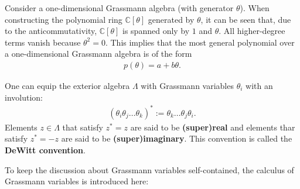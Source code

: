     \begin{property}[Polynomials]
        Consider a one-dimensional Grassmann algebra (with generator $\theta$). When constructing the polynomial ring $\mathbb{C}[\theta]$ generated by $\theta$, it can be seen that, due to the anticommutativity, $\mathbb{C}[\theta]$ is spanned only by $1$ and $\theta$. All higher-degree terms vanish because $\theta^2 = 0$. This implies that the most general polynomial over a one-dimensional Grassmann algebra is of the form
        \begin{gather}
            p(\theta) = a + b\theta.
        \end{gather}
    \end{property}

    \begin{definition}
        One can equip the exterior algebra $\Lambda$ with Grassmann variables $\theta_i$ with an involution:
        \begin{gather}
            (\theta_i\theta_j\ldots\theta_k)^* := \theta_k\ldots\theta_j\theta_i.
        \end{gather}
        Elements $z\in\Lambda$ that satisfy $z^*=z$ are said to be \textbf{(super)real} and elements thar satisfy $z^*=-z$ are said to be \textbf{(super)imaginary}. This convention is called the \textbf{DeWitt convention}.
    \end{definition}

    To keep the discussion about Grassmann variables self-contained, the calculus of Grassmann variables is introduced here:

